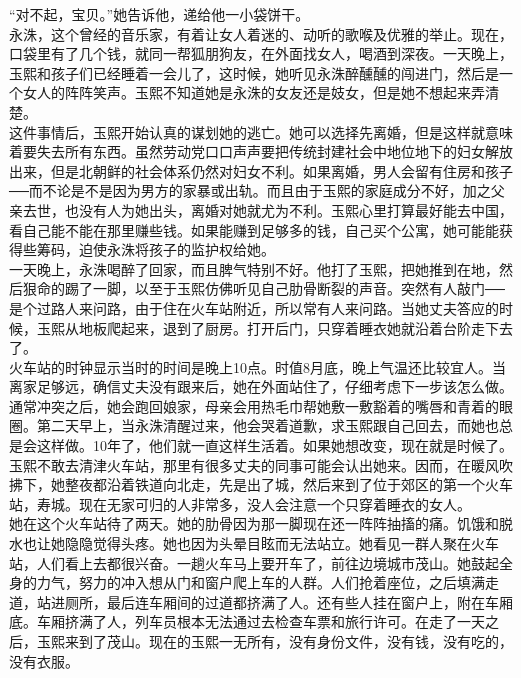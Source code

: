 \begin{multicols}{\theparacolNo}
“对不起，宝贝。”她告诉他，递给他一小袋饼干。\\

永洙，这个曾经的音乐家，有着让女人着迷的、动听的歌喉及优雅的举止。现在，口袋里有了几个钱，就同一帮狐朋狗友，在外面找女人，喝酒到深夜。一天晚上，玉熙和孩子们已经睡着一会儿了，这时候，她听见永洙醉醺醺的闯进门，然后是一个女人的阵阵笑声。玉熙不知道她是永洙的女友还是妓女，但是她不想起来弄清楚。\\

这件事情后，玉熙开始认真的谋划她的逃亡。她可以选择先离婚，但是这样就意味着要失去所有东西。虽然劳动党口口声声要把传统封建社会中地位地下的妇女解放出来，但是北朝鲜的社会体系仍然对妇女不利。如果离婚，男人会留有住房和孩子──而不论是不是因为男方的家暴或出轨。而且由于玉熙的家庭成分不好，加之父亲去世，也没有人为她出头，离婚对她就尤为不利。玉熙心里打算最好能去中国，看自己能不能在那里赚些钱。如果能赚到足够多的钱，自己买个公寓，她可能能获得些筹码，迫使永洙将孩子的监护权给她。\\

一天晚上，永洙喝醉了回家，而且脾气特别不好。他打了玉熙，把她推到在地，然后狠命的踢了一脚，以至于玉熙仿佛听见自己肋骨断裂的声音。突然有人敲门──是个过路人来问路，由于住在火车站附近，所以常有人来问路。当她丈夫答应的时候，玉熙从地板爬起来，退到了厨房。打开后门，只穿着睡衣她就沿着台阶走下去了。\\

火车站的时钟显示当时的时间是晚上10点。时值8月底，晚上气温还比较宜人。当离家足够远，确信丈夫没有跟来后，她在外面站住了，仔细考虑下一步该怎么做。通常冲突之后，她会跑回娘家，母亲会用热毛巾帮她敷一敷豁着的嘴唇和青着的眼圈。第二天早上，当永洙清醒过来，他会哭着道歉，求玉熙跟自己回去，而她也总是会这样做。10年了，他们就一直这样生活着。如果她想改变，现在就是时候了。\\

玉熙不敢去清津火车站，那里有很多丈夫的同事可能会认出她来。因而，在暖风吹拂下，她整夜都沿着铁道向北走，先是出了城，然后来到了位于郊区的第一个火车站，寿城。现在无家可归的人非常多，没人会注意一个只穿着睡衣的女人。\\

她在这个火车站待了两天。她的肋骨因为那一脚现在还一阵阵抽搐的痛。饥饿和脱水也让她隐隐觉得头疼。她也因为头晕目眩而无法站立。她看见一群人聚在火车站，人们看上去都很兴奋。一趟火车马上要开车了，前往边境城市茂山。她鼓起全身的力气，努力的冲入想从门和窗户爬上车的人群。人们抢着座位，之后填满走道，站进厕所，最后连车厢间的过道都挤满了人。还有些人挂在窗户上，附在车厢底。车厢挤满了人，列车员根本无法通过去检查车票和旅行许可。在走了一天之后，玉熙来到了茂山。现在的玉熙一无所有，没有身份文件，没有钱，没有吃的，没有衣服。\\


\end{multicols}
